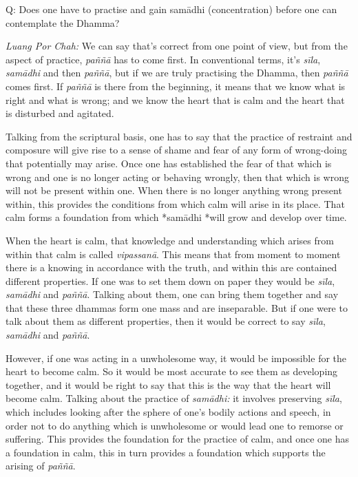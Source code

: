 Q: Does one have to practise and gain samādhi (concentration) before one
can contemplate the Dhamma?

\emph{Luang Por Chah:} We can say that's correct from one point of view,
but from the aspect of practice, \emph{paññā} has to come first. In
conventional terms, it's \emph{sīla}, \emph{samādhi} and then
\emph{paññā}, but if we are truly practising the Dhamma, then
\emph{paññā} comes first. If \emph{paññā} is there from the beginning,
it means that we know what is right and what is wrong; and we know the
heart that is calm and the heart that is disturbed and agitated.

Talking from the scriptural basis, one has to say that the practice of
restraint and composure will give rise to a sense of shame and fear of
any form of wrong-doing that potentially may arise. Once one has
established the fear of that which is wrong and one is no longer acting
or behaving wrongly, then that which is wrong will not be present within
one. When there is no longer anything wrong present within, this
provides the conditions from which calm will arise in its place. That
calm forms a foundation from which *samādhi *will grow and develop over
time.

When the heart is calm, that knowledge and understanding which arises
from within that calm is called \emph{vipassanā}. This means that from
moment to moment there is a knowing in accordance with the truth, and
within this are contained different properties. If one was to set them
down on paper they would be \emph{sīla}, \emph{samādhi} and
\emph{paññā}. Talking about them, one can bring them together and say
that these three dhammas form one mass and are inseparable. But if one
were to talk about them as different properties, then it would be
correct to say \emph{sīla}, \emph{samādhi} and \emph{paññā}.

However, if one was acting in a unwholesome way, it would be impossible
for the heart to become calm. So it would be most accurate to see them
as developing together, and it would be right to say that this is the
way that the heart will become calm. Talking about the practice of
\emph{samādhi:} it involves preserving \emph{sīla}, which includes
looking after the sphere of one's bodily actions and speech, in order
not to do anything which is unwholesome or would lead one to remorse or
suffering. This provides the foundation for the practice of calm, and
once one has a foundation in calm, this in turn provides a foundation
which supports the arising of \emph{paññā}.

